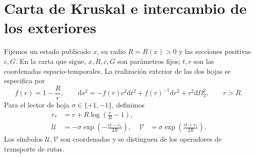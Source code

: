 \section{Carta de Kruskal e intercambio de los exteriores}
\label{x_reciprocidad:vii:subsec:kruskal-dos-hojas}

Fijemos un estado publicado \(x\), su radio \(R=R(x)>0\) y las
secciones positivas \(c,G\). En la carta que sigue, \(x,R,c,G\)
son parámetros fijos; \(t,r\) son las coordenadas espacio-temporales.
La realización exterior de las dos hojas se especifica por
\begin{equation}
 f(r)=1-\frac Rr,\qquad
 \mathrm ds^2=-f(r)c^2\mathrm dt^2+f(r)^{-1}\mathrm dr^2
                 +r^2\mathrm d\Omega_2^2,\qquad r>R.
 \label{x_reciprocidad:vii:eq:metrica-exterior}
\end{equation}
Para el lector de hoja \(\sigma\in\{+1,-1\}\), definimos
\begin{align}
 r_*&=r+R\log\left(\frac rR-1\right),\\
 \mathcal U&=-\sigma\exp\left(-\frac{ct-r_*}{2R}\right),&
 \mathcal V&=\sigma\exp\left(\frac{ct+r_*}{2R}\right).
 \label{x_reciprocidad:vii:eq:carta-kruskal}
\end{align}
Los símbolos \(\mathcal U,\mathcal V\) son coordenadas y se
distinguen de los operadores de transporte de rutas.

